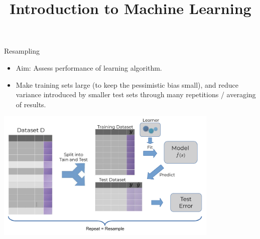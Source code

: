 \documentclass[11pt,compress,t,notes=noshow, xcolor=table]{beamer}
\title{Introduction to Machine Learning}
\institute{\href{https://compstat-lmu.github.io/lecture_i2ml/}{compstat-lmu.github.io/lecture\_i2ml}}
\date{}
\begin{document}

















\begin{vbframe}{Resampling}

\begin{itemize}
  \item Aim: Assess performance of learning algorithm.
  \item Make training sets large (to keep the pessimistic bias small),
  and reduce variance introduced by smaller test sets through many repetitions / averaging of results.
\end{itemize}

\begin{center}
\includegraphics[width=0.8\textwidth]{figure_man/resampling_error.pdf}
\end{center}

\end{vbframe}
\end{document}

